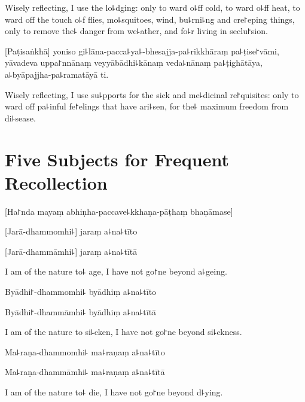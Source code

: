 \begin{english}
  Wisely reflecting, I use the lo꜕dging: only to ward o꜕ff cold, to ward o꜕ff heat, to ward off the touch o꜕f flies, mo꜕squitoes, wind, bu꜕rni꜕ng and cre꜓eping things, only to remove the꜕ danger from we꜕ather, and fo꜕r living in seclu꜓sion.
\end{english}

[Paṭisaṅkhā] yoniso gi꜕lāna-pacca꜕ya꜕-bhesajja-pa꜕rikkhāraṃ pa꜕ṭise꜓vāmi, yāvadeva uppa꜓nnānaṃ veyyābādhi꜕kānaṃ veda꜕nānaṃ pa꜕ṭighātāya, a꜕byāpajjha-pa꜕ramatāyā ti.

\begin{english}
  Wisely reflecting, I use su꜕pports for the sick and me꜕dicinal re꜓quisites: only to ward off pa꜕inful fe꜓elings that have ari꜕sen, for the꜕ maximum freedom from di꜕sease.
\end{english}

\chapter[Five Subjects]{Five Subjects for Frequent Recollection}%



\begin{leader}
  [Ha꜓nda mayaṃ abhiṇha-paccave꜕kkhaṇa-pāṭhaṃ bhaṇāmase]
\end{leader}

%
[Jarā-dhammomhi꜕] jaraṃ a꜕na꜕tīto

%
[Jarā-dhammāmhi꜕] jaraṃ a꜕na꜕tītā

\begin{english}
  I am of the nature to꜕ age, I have not go꜓ne beyond a꜕geing.
\end{english}

%
Byādhi꜓-dhammomhi꜕ byādhiṃ a꜕na꜕tīto

%
Byādhi꜓-dhammāmhi꜕ byādhiṃ a꜕na꜕tītā

\begin{english}
  I am of the nature to si꜕cken, I have not go꜓ne beyond si꜕ckness.
\end{english}

%
Ma꜕raṇa-dhammomhi꜕ ma꜕raṇaṃ a꜕na꜕tīto

%
Ma꜕raṇa-dhammāmhi꜕ ma꜕raṇaṃ a꜕na꜕tītā

\begin{english}
  I am of the nature to꜕ die, I have not go꜓ne beyond d꜕ying.
\end{english}

